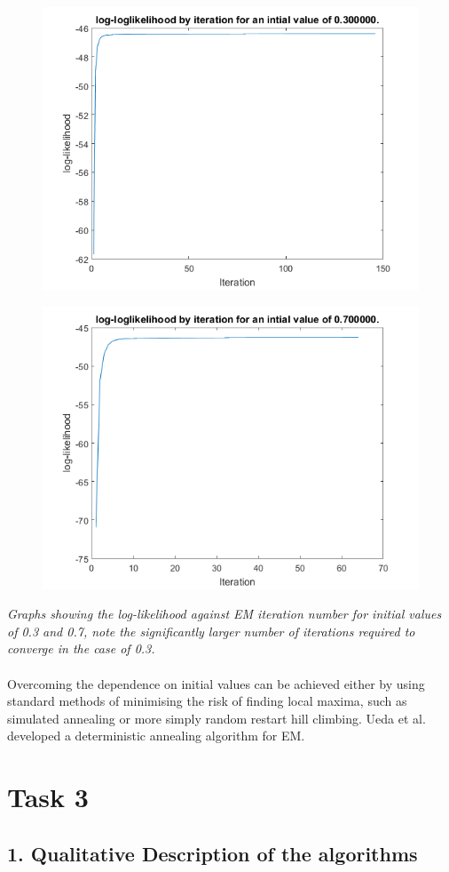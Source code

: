 \documentclass{article}
\begin{document}
\begin{figure}[h!]
\centering
\includegraphics[width=0.7\linewidth]{images/LL3}
\label{fig:LL2}
\end{figure}
\begin{figure}[h!]
\centering
\includegraphics[width=0.7\linewidth]{images/LL7}
\label{fig:LL7}
\end{figure}
\textit{Graphs showing the log-likelihood against EM iteration number for initial values of 0.3 and 0.7, note the significantly larger number of iterations required to converge in the case of 0.3.}\\\\

Overcoming the dependence on initial values can be achieved either by using standard methods of minimising the risk of finding local maxima, such as simulated annealing or more simply random restart hill climbing. Ueda et al. developed a deterministic annealing algorithm for EM.\cite{ueda1998deterministic}

\section{Task 3}
\subsection{1. Qualitative Description of the algorithms}
\end{document}
